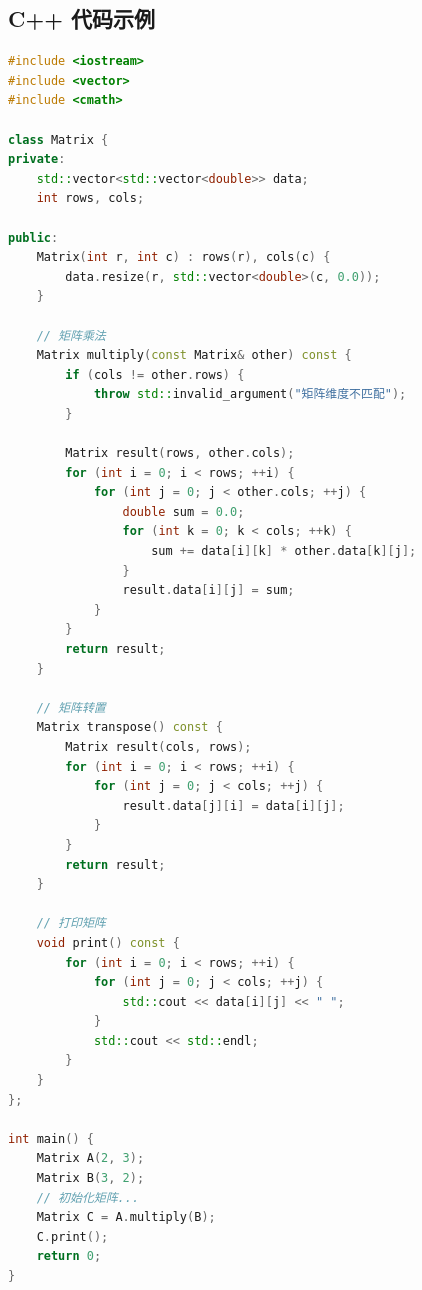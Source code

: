 \subsection{C++ 代码示例}
\begin{lstlisting}[language=C++, caption=C++矩阵运算示例]
#include <iostream>
#include <vector>
#include <cmath>

class Matrix {
private:
    std::vector<std::vector<double>> data;
    int rows, cols;
    
public:
    Matrix(int r, int c) : rows(r), cols(c) {
        data.resize(r, std::vector<double>(c, 0.0));
    }
    
    // 矩阵乘法
    Matrix multiply(const Matrix& other) const {
        if (cols != other.rows) {
            throw std::invalid_argument("矩阵维度不匹配");
        }
        
        Matrix result(rows, other.cols);
        for (int i = 0; i < rows; ++i) {
            for (int j = 0; j < other.cols; ++j) {
                double sum = 0.0;
                for (int k = 0; k < cols; ++k) {
                    sum += data[i][k] * other.data[k][j];
                }
                result.data[i][j] = sum;
            }
        }
        return result;
    }
    
    // 矩阵转置
    Matrix transpose() const {
        Matrix result(cols, rows);
        for (int i = 0; i < rows; ++i) {
            for (int j = 0; j < cols; ++j) {
                result.data[j][i] = data[i][j];
            }
        }
        return result;
    }
    
    // 打印矩阵
    void print() const {
        for (int i = 0; i < rows; ++i) {
            for (int j = 0; j < cols; ++j) {
                std::cout << data[i][j] << " ";
            }
            std::cout << std::endl;
        }
    }
};

int main() {
    Matrix A(2, 3);
    Matrix B(3, 2);
    // 初始化矩阵...
    Matrix C = A.multiply(B);
    C.print();
    return 0;
}
\end{lstlisting}

